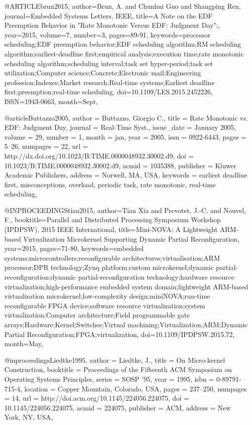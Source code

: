 @ARTICLE{brun2015, 
author={Brun, A. and Chunhui Guo and Shangping Ren}, 
journal={Embedded Systems Letters, IEEE}, 
title={A Note on the EDF Preemption Behavior in "Rate Monotonic Versus EDF: Judgment Day";}, 
year={2015}, 
volume={7}, 
number={3}, 
pages={89-91}, 
keywords={processor scheduling;EDF preemption behavior;EDF scheduling algorithm;RM scheduling algorithm;earliest-deadline first;empirical analysis;execution time;rate monotonic scheduling algorithm;scheduling interval;task set hyper-period;task set utilization;Computer science;Concrete;Electronic mail;Engineering profession;Indexes;Market research;Real-time systems;Earliest deadline first;preemption;real-time scheduling}, 
doi={10.1109/LES.2015.2452226}, 
ISSN={1943-0663}, 
month={Sept},}

@article{Buttazzo2005,
 author = {Buttazzo, Giorgio C.},
 title = {Rate Monotonic vs. EDF: Judgment Day},
 journal = {Real-Time Syst.},
 issue_date = {January 2005},
 volume = {29},
 number = {1},
 month = jan,
 year = {2005},
 issn = {0922-6443},
 pages = {5--26},
 numpages = {22},
 url = {http://dx.doi.org/10.1023/B:TIME.0000048932.30002.d9},
 doi = {10.1023/B:TIME.0000048932.30002.d9},
 acmid = {1035388},
 publisher = {Kluwer Academic Publishers},
 address = {Norwell, MA, USA},
 keywords = {earliest deadline first, misconceptions, overload, periodic task, rate monotonic, real-time scheduling},
}

@INPROCEEDINGS{tian2015, 
author={Tian Xia and Prevotet, J.-C. and Nouvel, F.}, 
booktitle={Parallel and Distributed Processing Symposium Workshop (IPDPSW), 2015 IEEE International}, 
title={Mini-NOVA: A Lightweight ARM-based Virtualization Microkernel Supporting Dynamic Partial Reconfiguration}, 
year={2015}, 
pages={71-80}, 
keywords={embedded systems;microcontrollers;reconfigurable architectures;virtualisation;ARM processor;DPR technology;Zynq platform;custom microkernel;dynamic partial-reconfiguration;dynamic partial-reconfiguration technology;hardware resource virtualization;high-performance embedded system domain;lightweight ARM-based virtualization microkernel;low-complexity design;miniNOVA;run-time reconfigurable FPGA device;software resource virtualization;system virtualization;Computer architecture;Field programmable gate arrays;Hardware;Kernel;Switches;Virtual machining;Virtualization;ARM;Dynamic Partial Reconfiguration;FPGA;virtualization}, 
doi={10.1109/IPDPSW.2015.72}, 
month={May},}

@inproceedings{Liedtke1995,
 author = {Liedtke, J.},
 title = {On Micro-kernel Construction},
 booktitle = {Proceedings of the Fifteenth ACM Symposium on Operating Systems Principles},
 series = {SOSP '95},
 year = {1995},
 isbn = {0-89791-715-4},
 location = {Copper Mountain, Colorado, USA},
 pages = {237--250},
 numpages = {14},
 url = {http://doi.acm.org/10.1145/224056.224075},
 doi = {10.1145/224056.224075},
 acmid = {224075},
 publisher = {ACM},
 address = {New York, NY, USA},
} 

